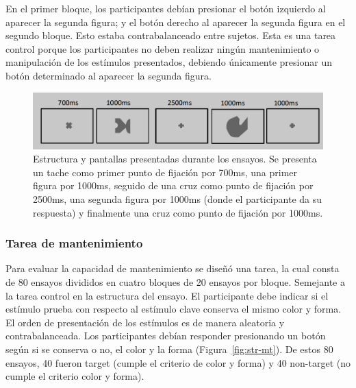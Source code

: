 \documentclass[12pt,letterpaper,final]{article}
\begin{document}
En el primer bloque, los participantes debían presionar el botón izquierdo al aparecer la segunda figura; y el botón derecho al aparecer la segunda figura en el segundo bloque. Esto estaba contrabalanceado entre sujetos. Esta es una tarea control porque los participantes no deben realizar ningún mantenimiento o manipulación de los estímulos presentados, debiendo únicamente presionar un botón determinado al aparecer la segunda figura.

\begin{figure}[ht]
	\centering
	\includegraphics[scale=0.5]{ensayoMT.png}
	\caption{Estructura y pantallas presentadas durante los ensayos. Se presenta un tache como primer punto de fijación por 700ms, una primer figura por 1000ms, seguido de una cruz como punto de fijación por 2500ms, una segunda figura por 1000ms  (donde el participante da su respuesta) y finalmente una cruz como punto de fijación por 1000ms.}
	\label{fig:EstruturaEnsayo}
\end{figure}


\subsubsection{Tarea de mantenimiento}
Para evaluar la capacidad de mantenimiento se diseñó una tarea, la cual consta de 80 ensayos divididos en cuatro bloques de 20 ensayos por bloque.  Semejante a la tarea control en la estructura del ensayo. El participante   debe indicar si el estímulo prueba con respecto al estímulo clave conserva el mismo color y forma. El orden de presentación de los estímulos es de manera aleatoria y contrabalanceada.
Los participantes debían responder presionando un botón según si se conserva o no, el color y la forma (Figura~\ref{fig:str-mt}).
De estos 80 ensayos, 40 fueron target (cumple el criterio de color y forma) y 40 non-target (no cumple el criterio color y forma). %
\end{document}
